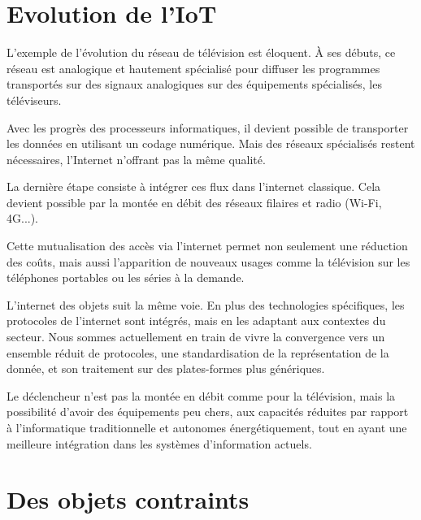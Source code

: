   \vspace{2em}

\section{Evolution de l'IoT}

  \vspace{1em}

L’exemple de l’évolution du réseau de télévision est éloquent. À ses débuts, ce réseau est analogique et hautement spécialisé pour diffuser les programmes transportés sur des signaux analogiques sur des équipements spécialisés, les téléviseurs.

Avec les progrès des processeurs informatiques, il devient possible de transporter les données en utilisant un codage numérique. Mais des réseaux spécialisés restent nécessaires, l’Internet n’offrant pas la même qualité.



La dernière étape consiste à intégrer ces flux dans l’internet classique. Cela devient possible par la montée en débit des réseaux filaires et radio (Wi-Fi, 4G...). 

Cette mutualisation des accès via l’internet permet non seulement une réduction des coûts, mais aussi l'apparition de nouveaux usages comme la télévision sur les téléphones portables ou les séries à la demande.

L’internet des objets suit la même voie. En plus des technologies spécifiques, les protocoles de l’internet sont intégrés, mais en les adaptant aux contextes du secteur.  Nous sommes actuellement en train de vivre la convergence vers un ensemble réduit de protocoles, une standardisation de la représentation de la donnée, et son traitement sur des plates-formes plus génériques. 

Le déclencheur n’est pas la montée en débit comme pour la télévision, mais la possibilité d'avoir des équipements peu chers, aux capacités réduites par rapport à l'informatique traditionnelle et autonomes énergétiquement, tout en ayant une meilleure intégration dans les systèmes d'information actuels.  

  \vspace{2em}

\section{Des objets contraints}

  \vspace{1em}

